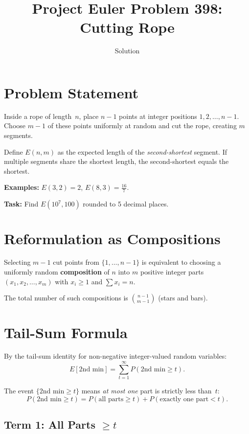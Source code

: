 \documentclass[11pt,a4paper]{article}
\title{Project Euler Problem 398: Cutting Rope}
\author{Solution}
\date{}
\begin{document}
\maketitle

\section{Problem Statement}

Inside a rope of length~$n$, place $n-1$ points at integer positions $1, 2, \ldots, n-1$.
Choose $m-1$ of these points uniformly at random and cut the rope, creating $m$ segments.

Define $E(n, m)$ as the expected length of the \emph{second-shortest} segment. If multiple
segments share the shortest length, the second-shortest equals the shortest.

\medskip
\noindent\textbf{Examples:} $E(3, 2) = 2$, \quad $E(8, 3) = \tfrac{16}{7}$.

\medskip
\noindent\textbf{Task:} Find $E(10^7, 100)$ rounded to 5 decimal places.

\section{Reformulation as Compositions}

Selecting $m-1$ cut points from $\{1, \ldots, n-1\}$ is equivalent to choosing a
uniformly random \textbf{composition} of $n$ into $m$ positive integer parts
$(x_1, x_2, \ldots, x_m)$ with $x_i \ge 1$ and $\sum x_i = n$.

The total number of such compositions is $\binom{n-1}{m-1}$ (stars and bars).

\section{Tail-Sum Formula}

By the tail-sum identity for non-negative integer-valued random variables:
\[
    E[\text{2nd min}] = \sum_{t=1}^{\infty} P(\text{2nd min} \ge t).
\]

The event $\{\text{2nd min} \ge t\}$ means \emph{at most one} part is strictly less than~$t$:
\[
    P(\text{2nd min} \ge t) = P(\text{all parts} \ge t) + P(\text{exactly one part} < t).
\]

\subsection{Term 1: All Parts $\ge t$}
\end{document}
